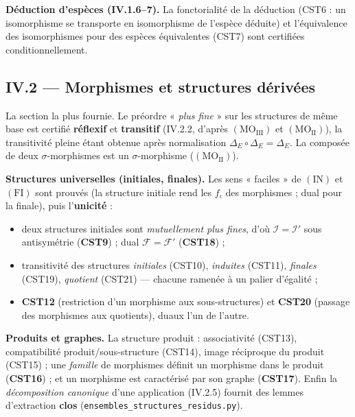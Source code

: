 \textbf{Déduction d'espèces (IV.1.6--7).} La fonctorialité de la déduction
(CST6 : un isomorphisme se transporte en isomorphisme de l'espèce déduite) et
l'équivalence des isomorphismes pour des espèces équivalentes (CST7) sont
certifiées conditionnellement.

\subsection{IV.2 --- Morphismes et structures dérivées}

La section la plus fournie. Le préordre « \emph{plus fine} » sur les structures
de même base est certifié \textbf{réflexif} et \textbf{transitif} (IV.2.2,
d'après $(\mathrm{MO}_{\mathrm{III}})$ et $(\mathrm{MO}_{\mathrm{II}})$), la
transitivité pleine étant obtenue après normalisation $\Delta_E\circ\Delta_E=
\Delta_E$. La composée de deux $\sigma$-morphismes est un $\sigma$-morphisme
($(\mathrm{MO}_{\mathrm{II}})$).

\textbf{Structures universelles (initiales, finales).} Les sens « faciles » de
$(\mathrm{IN})$ et $(\mathrm{FI})$ sont prouvés (la structure initiale rend les
$f_\iota$ des morphismes ; dual pour la finale), puis l'\textbf{unicité} :
\begin{itemize}
  \item deux structures initiales sont \emph{mutuellement plus fines}, d'où
        $\mathcal{I}=\mathcal{I}'$ sous antisymétrie (\textbf{CST9}) ; dual
        $\mathcal{F}=\mathcal{F}'$ (\textbf{CST18}) ;
  \item transitivité des structures \emph{initiales} (CST10), \emph{induites}
        (CST11), \emph{finales} (CST19), \emph{quotient} (CST21) --- chacune
        ramenée à un palier d'égalité ;
  \item \textbf{CST12} (restriction d'un morphisme aux sous-structures) et
        \textbf{CST20} (passage des morphismes aux quotients), duaux l'un de
        l'autre.
\end{itemize}

\textbf{Produits et graphes.} La structure produit : associativité (CST13),
compatibilité produit/sous-structure (CST14), image réciproque du produit
(CST15) ; une \emph{famille} de morphismes définit un morphisme dans le produit
(\textbf{CST16}) ; et un morphisme est caractérisé par son graphe
(\textbf{CST17}). Enfin la \emph{décomposition canonique} d'une application
(IV.2.5) fournit des lemmes d'extraction \textbf{clos}
(\texttt{ensembles\_structures\_residus.py}).

